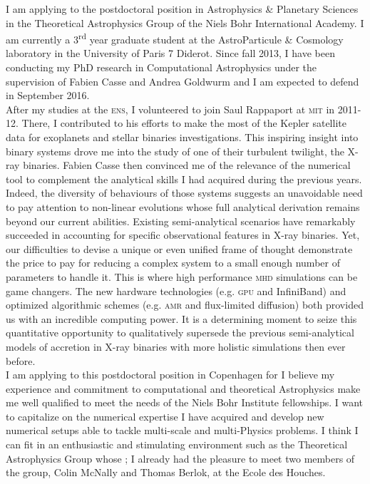 \documentclass[12pt]{letter}
\begin{document}
\begin{letter} {}
\hspace*{0.5cm} I am applying to the postdoctoral position in Astrophysics \& Planetary Sciences in the Theoretical Astrophysics Group of the Niels Bohr International Academy. I am currently a 3\textsuperscript{rd} year graduate student at the AstroParticule \& Cosmology laboratory in the University of Paris 7 Diderot. Since fall 2013, I have been conducting my PhD research in Computational Astrophysics under the supervision of Fabien Casse and Andrea Goldwurm and I am expected to defend in September 2016.\\
\hspace*{0.5cm} After my studies at the \textsc{ens}, I volunteered to join Saul Rappaport at \textsc{mit} in 2011-12. There, I contributed to his efforts to make the most of the Kepler satellite data for exoplanets and stellar binaries investigations. This inspiring insight into binary systems drove me into the study of one of their turbulent twilight, the X-ray binaries. Fabien Casse then convinced me of the relevance of the numerical tool to complement the analytical skills I had acquired during the previous years. Indeed, the diversity of behaviours of those systems suggests an unavoidable need to pay attention to non-linear evolutions whose full analytical derivation remains beyond our current abilities. Existing semi-analytical scenarios have remarkably succeeded in accounting for specific observational features in X-ray binaries. Yet, our difficulties to devise a unique or even unified frame of thought demonstrate the price to pay for reducing a complex system to a small enough number of parameters to handle it. This is where high performance \textsc{mhd} simulations can be game changers. The new hardware technologies (e.g. \textsc{gpu} and InfiniBand) and optimized algorithmic schemes (e.g. \textsc{amr} and flux-limited diffusion) both provided us with an incredible computing power. It is a determining moment to seize this quantitative opportunity to qualitatively supersede the previous semi-analytical models of accretion in X-ray binaries with more holistic simulations then ever before.\\
\hspace*{0.5cm} I am applying to this postdoctoral position in Copenhagen for I believe my experience and commitment to computational and theoretical Astrophysics make me well qualified to meet the needs of the Niels Bohr Institute fellowships. I want to capitalize on the numerical expertise I have acquired and develop new numerical setups able to tackle multi-scale and multi-Physics problems. I think I can fit in an enthusiastic and stimulating environment such as the Theoretical Astrophysics Group whose ; I already had the pleasure to meet two members of the group, Colin McNally and Thomas Berlok, at the Ecole des Houches.\\

\end{letter}
\end{document}
